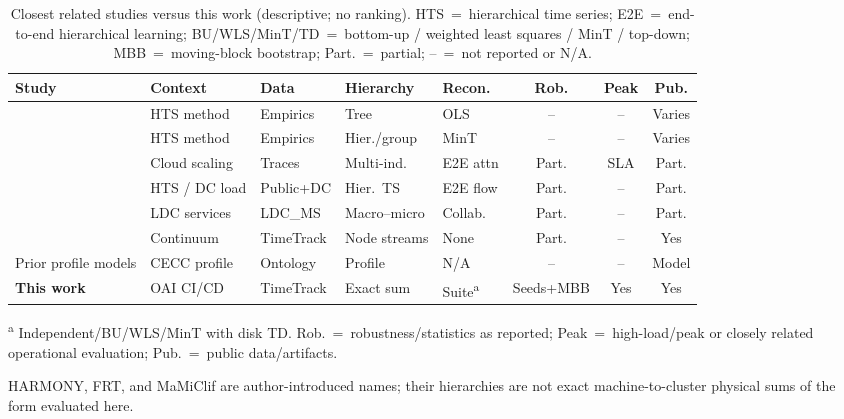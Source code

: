 \begin{table}[width=\textwidth,pos=t]
\centering
\caption{Closest related studies versus this work (descriptive; no ranking).
HTS~=~hierarchical time series; E2E~=~end-to-end hierarchical learning;
BU/{WLS}/MinT/{TD}~=~bottom-up / weighted least squares / MinT / top-down;
MBB~=~moving-block bootstrap; Part.~=~partial; --~=~not reported or N/A.}
\label{tab:related}
\begin{threeparttable}
\small
\setlength{\tabcolsep}{2.8pt}
\begin{tabularx}{\tblwidth}{@{}>{\raggedright\arraybackslash}p{1.85cm}>{\raggedright\arraybackslash}X>{\raggedright\arraybackslash}X>{\raggedright\arraybackslash}X>{\raggedright\arraybackslash}Xccc@{}}
\toprule
Study & Context & Data & Hierarchy & Recon. & Rob. & Peak & Pub. \\
\midrule
\cite{hyndman2011optimal} & HTS method & Empirics & Tree & OLS & -- & -- & Varies \\
\cite{wickramasuriya2019mint} & HTS method & Empirics & Hier./group & MinT & -- & -- & Varies \\
\cite{harmony2024} & Cloud scaling & Traces & Multi-ind. & E2E attn & Part. & SLA & Part. \\
\cite{wang2025frt} & HTS / DC load & Public+DC & Hier.\ TS & E2E flow & Part. & -- & Part. \\
\cite{gao2026mamiclif} & LDC services & LDC\_MS & Macro--micro & Collab. & Part. & -- & Part. \\
\cite{meliani2026zerotouch} & Continuum & TimeTrack & Node streams & None & Part. & -- & Yes \\
Prior profile models & CECC profile & Ontology & Profile & N/A & -- & -- & Model \\
\textbf{This work} & OAI CI/CD & TimeTrack & Exact sum & Suite\textsuperscript{a} & Seeds+MBB & Yes & Yes \\
\bottomrule
\end{tabularx}
\begin{tablenotes}
\footnotesize
\item\textsuperscript{a} Independent/BU/{WLS}/MinT with disk {TD}.
Rob.~=~robustness/statistics as reported; Peak~=~high-load/peak or closely
related operational evaluation; Pub.~=~public data/artifacts.
\item {HARMONY}, {FRT}, and {MaMiClif} are author-introduced names; their
hierarchies are not exact machine-to-cluster physical sums of the form evaluated
here.
\end{tablenotes}
\end{threeparttable}
\end{table}
